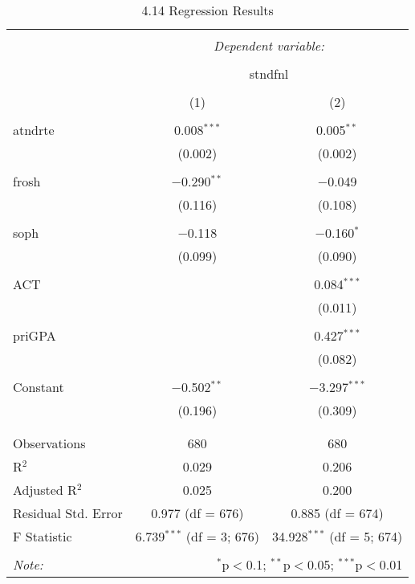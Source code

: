 \documentclass[11pt]{article} %
\begin{document}
  \begin{table}[!htbp] \centering 
    \caption{4.14 Regression Results} 
    \label{table:4.14} 
  \begin{tabular}{@{\extracolsep{5pt}}lcc} 
  \\[-1.8ex]\hline 
  \hline \\[-1.8ex] 
   & \multicolumn{2}{c}{\textit{Dependent variable:}} \\ 
  \cline{2-3} 
  \\[-1.8ex] & \multicolumn{2}{c}{stndfnl} \\ 
  \\[-1.8ex] & (1) & (2)\\ 
  \hline \\[-1.8ex] 
   atndrte & 0.008$^{***}$ & 0.005$^{**}$ \\ 
    & (0.002) & (0.002) \\ 
    & & \\ 
   frosh & $-$0.290$^{**}$ & $-$0.049 \\ 
    & (0.116) & (0.108) \\ 
    & & \\ 
   soph & $-$0.118 & $-$0.160$^{*}$ \\ 
    & (0.099) & (0.090) \\ 
    & & \\ 
   ACT &  & 0.084$^{***}$ \\ 
    &  & (0.011) \\ 
    & & \\ 
   priGPA &  & 0.427$^{***}$ \\ 
    &  & (0.082) \\ 
    & & \\ 
   Constant & $-$0.502$^{**}$ & $-$3.297$^{***}$ \\ 
    & (0.196) & (0.309) \\ 
    & & \\ 
  \hline \\[-1.8ex] 
  Observations & 680 & 680 \\ 
  R$^{2}$ & 0.029 & 0.206 \\ 
  Adjusted R$^{2}$ & 0.025 & 0.200 \\ 
  Residual Std. Error & 0.977 (df = 676) & 0.885 (df = 674) \\ 
  F Statistic & 6.739$^{***}$ (df = 3; 676) & 34.928$^{***}$ (df = 5; 674) \\ 
  \hline 
  \hline \\[-1.8ex] 
  \textit{Note:}  & \multicolumn{2}{r}{$^{*}$p$<$0.1; $^{**}$p$<$0.05; $^{***}$p$<$0.01} \\ 
  \end{tabular} 
  \end{table} 
\end{document}
